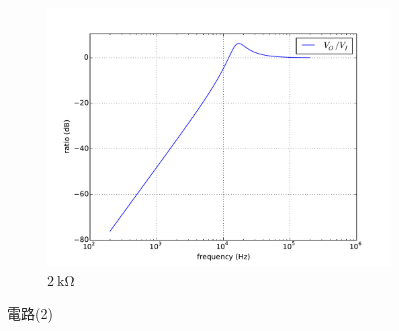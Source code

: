 \documentclass[12pt, a4paper]{article}
\begin{document}
\begin{enumerate}[itemsep=20pt, topsep=10pt]
\begin{enumerate}[label=(\alph*)]
\begin{figure}[H]
\begin{subfigure}[b]{0.45\textwidth}
          \includegraphics[width=1\textwidth]{circuit/p23.pdf}
          \caption{$\SI{2}\kohm$}
        \end{subfigure}
        \caption{電路(2)}
      \end{figure}
      \clearpage


\end{enumerate}
\end{enumerate}
\end{document}
